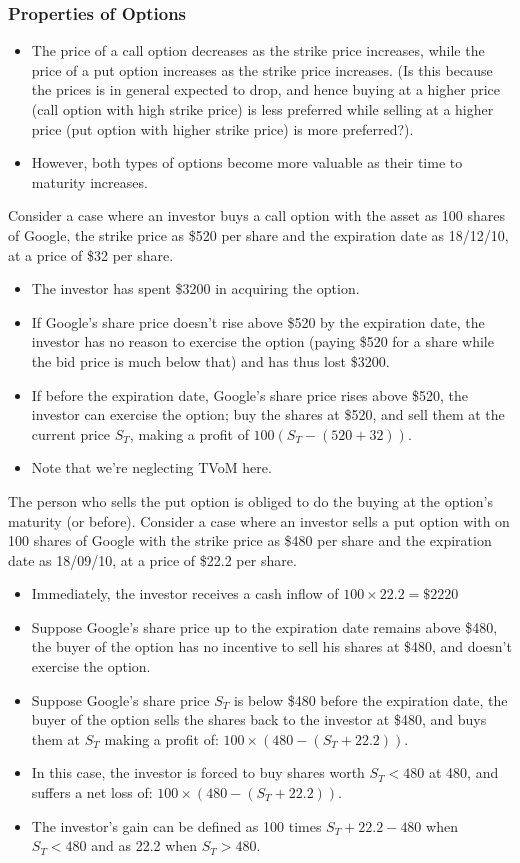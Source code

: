 \documentclass{article}
\begin{document}
\subsubsection{Properties of Options}
\begin{itemize}
    \item The price of a call option decreases as the strike price increases,
    while the price of a put option increases as the
    strike price increases. (Is this because the prices is in general expected to drop,
    and hence buying at a higher price (call option with high strike price)
    is less preferred while selling at a higher price (put option with higher strike price)
    is more preferred?).
    \item However, both types of options become more valuable as 
    their time to maturity increases.
\end{itemize}
Consider a case where an investor buys a call option with the asset as 100 shares of Google,
the strike price as \$520 per share and the expiration date as 18/12/10, at a price of \$32 per share.
\begin{itemize}
    \item The investor has spent \$3200 in acquiring the option.
    \item If Google's share price doesn't rise above \$520 by the expiration date,
    the investor has no reason to exercise the option (paying \$520 for a share while the
    bid price is much below that) and has thus lost \$3200.
    \item If before the expiration date, Google's share price rises above \$520, the investor can
    exercise the option; buy the shares at \$520, and sell them at the current price $S_T$, making
    a profit of $100(S_T-(520+32))$.
    \item Note that we're neglecting TVoM here.  
\end{itemize}
The person who sells the put option is obliged to do the buying at the option's maturity (or before).
Consider a case where an investor sells a put option with on 100 shares of Google with the 
strike price as \$480 per share and the expiration date as 18/09/10, at a price of \$22.2 per share.
\begin{itemize}
    \item Immediately, the investor receives a cash inflow of $100\times22.2=\$2220$
    \item Suppose Google's share price up to the expiration date remains above \$480, the buyer of the
    option has no incentive to sell his shares at \$480, and doesn't exercise the option.
    \item Suppose Google's share price $S_T$ is below \$480 before the expiration date, the buyer of the option
    sells the shares back to the investor at \$480, and buys them at $S_T$ making a profit of: $100\times(480-(S_T+22.2))$.
    \item In this case, the investor is forced to buy shares worth $S_T<480$ at 480, and suffers a net loss of:
    $100\times(480-(S_T+22.2))$.
    \item The investor's gain can be defined as 100 times $S_T+22.2 - 480$ when $S_T < 480$ and as 22.2 when $S_T>480$.
\end{itemize}
\end{document}
